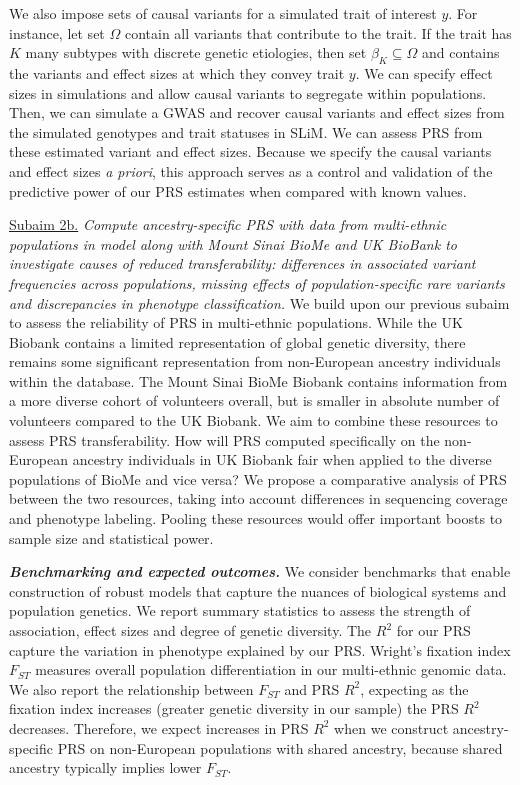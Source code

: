 \documentclass[11pt]{article}  %
\newlength\tindent
\renewcommand{\indent}{\hspace*{\tindent}}
\begin{document}
We also impose sets of causal variants for a simulated trait of interest $y$. For instance, let set $\Omega$ contain all variants that contribute to the trait. If the trait has $K$ many subtypes with discrete genetic etiologies, then set $\beta_K \subseteq \Omega$ and contains the variants and effect sizes at which they convey trait $y$. We can specify effect sizes in simulations and allow causal variants to segregate within populations. Then, we can simulate a GWAS and recover causal variants and effect sizes from the simulated genotypes and trait statuses in SLiM. We can assess PRS from these estimated variant and effect sizes. Because we specify the causal variants and effect sizes \textit{a priori}, this approach serves as a control and validation of the predictive power of our PRS estimates when compared with known values. 

\indent \underline{Subaim 2b.} \textit{Compute ancestry-specific PRS with data from multi-ethnic populations in model along with Mount Sinai BioMe and UK BioBank to investigate causes of reduced transferability: differences in associated variant frequencies across populations, missing effects of population-specific rare variants and discrepancies in phenotype classification.} We build upon our previous subaim to assess the reliability of PRS in multi-ethnic populations. While the UK Biobank contains a limited representation of global genetic diversity, there remains some significant representation from non-European ancestry individuals within the database. The Mount Sinai BioMe Biobank contains information from a more diverse cohort of volunteers overall, but is smaller in absolute number of volunteers compared to the UK Biobank. We aim to combine these resources to assess PRS transferability. How will PRS computed specifically on the non-European ancestry individuals in UK Biobank fair when applied to the diverse populations of BioMe and vice versa? We propose a comparative analysis of PRS between the two resources, taking into account differences in sequencing coverage and phenotype labeling. Pooling these resources would offer important boosts to sample size and statistical power. 

\indent \textbf{\textit{Benchmarking and expected outcomes.}} We consider benchmarks that enable construction of robust models that capture the nuances of biological systems and population genetics. We report summary statistics to assess the strength of association, effect sizes and degree of genetic diversity. The $R^2$ for our PRS capture the variation in phenotype explained by our PRS. Wright's fixation index $F_{ST}$ \cite{wright_differential_1945} measures overall population differentiation in our multi-ethnic genomic data. We also report the relationship between $F_{ST}$ and PRS $R^2$, expecting as the fixation index increases (greater genetic diversity in our sample) the PRS $R^2$ decreases. Therefore, we expect increases in PRS $R^2$ when we construct ancestry-specific PRS on non-European populations with shared ancestry, because shared ancestry typically implies lower $F_{ST}$.         
\end{document}
